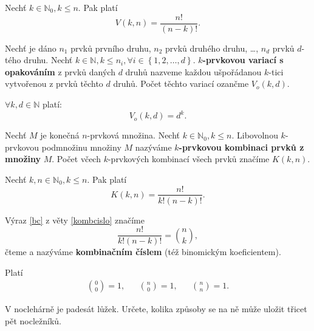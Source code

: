 \begin{veta}
    Nechť $k \in \mathbb N_0, k\leq n.$ Pak platí
    $$V(k,n)=\frac{n!}{(n-k)!}.$$
\end{veta}

\begin{definition}
    Nechť je dáno $n_1$ prvků prvního druhu, $n_2$ prvků druhého druhu, \dots,
    $n_d$ prvků $d$-tého druhu. Nechť $k\in \mathbb N, k \leq n_i, \forall
    i \in \left \{ 1, 2, \dots, d \right \} .$ \textbf{$k$-prvkovou variací s
    opakováním} z prvků daných $d$ druhů nazveme každou ušpořádanou $k$-tici
    vytvořenou z prvků těchto $d$ druhů. Počet těchto variací ozančme $V_o(k,d).$
\end{definition}

\begin{veta}
    $\forall k, d \in \mathbb N$ platí:
    $$V_o(k,d)=d^k.$$
\end{veta}

\begin{definition}
    Nechť $M$ je konečná $n$-prvková množina. Nechť $k \in \mathbb N_0, k\leq n.$
    Libovolnou $k$-prvkovou podmnožinu množiny $M$ nazýváme \textbf{$k$-prvkovou
    kombinaci prvků z množiny} $M$. Počet včech $k$-prvkových kombinací všech
    prvků značíme $K(k,n).$
\end{definition}

\begin{veta}\label{kombcislo}
    Nechť $k,n \in \mathbb N_0, k\leq n.$ Pak platí
    \begin{equation}\label{bc}
   K(k,n)=\frac{n!}{k!(n-k)!}.
    \end{equation}
\end{veta}

\begin{definition}
    Výraz \ref{bc} z věty \ref{kombcislo} značíme
    $$\frac{n!}{k!(n-k)!}=\binom{n}{k},$$
    čteme  a nazýváme \textbf{kombinačním číslem} (též binomickým
    koeficientem).
\end{definition}

\begin{pozn}
    Platí
    \begin{align*}
        \binom{0}{0}=1, & & \binom{n}{0}=1, & & \binom{n}{n} = 1.
    \end{align*}
\end{pozn}

\begin{priklad}
V noclehárně je padesát lůžek. Určete, kolika způsoby se na ně může uložit
třicet pět nocležníků.
\end{priklad}

